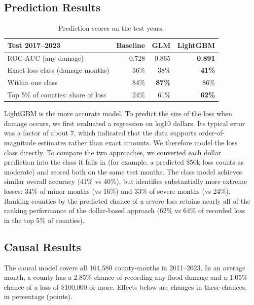 \documentclass[10pt,twocolumn]{article}
\begin{document}
\subsection{Prediction Results}

\begin{table}[H]
\centering
\small
\renewcommand{\arraystretch}{1.15}
\begin{tabularx}{\linewidth}{@{}Lrrr@{}}
\toprule
Test 2017--2023 & Baseline & GLM & LightGBM \\
\midrule
ROC-AUC (any damage)               & 0.728 & 0.865 & \textbf{0.891} \\
Exact loss class (damage months)   & 36\%  & 38\%  & \textbf{41\%} \\
Within one class                   & 84\%  & \textbf{87\%} & 86\% \\
Top 5\% of counties: share of loss & 24\%  & 61\%  & \textbf{62\%} \\
\bottomrule
\end{tabularx}
\caption{Prediction scores on the test years.}
\label{tab:pred-results}
\end{table}

LightGBM is the more accurate model. To predict the size of the
loss when damage occurs, we first evaluated a regression on log10 dollars. Its typical error was a factor of about 7, which indicated that the data supports order-of-magnitude estimates rather than exact amounts. We therefore model the loss class directly. To compare the two approaches,
we converted each dollar prediction into the class it falls in (for example, a predicted \$50k
loss counts as moderate) and scored both on the same test months. The class model achieves similar
overall accuracy (41\% vs 40\%), but identifies substantially more extreme losses: 34\% of minor
months (vs 16\%) and 33\% of severe months (vs 24\%). Ranking counties by the predicted chance of
a severe loss retains nearly all of the ranking performance of the dollar-based approach (62\% vs
64\% of recorded loss in the top 5\% of counties).

\subsection{Causal Results}
\label{sec:adj-results}

The causal model covers all 164{,}580 county-months in 2011--2023. In an average month, a county
has a 2.85\% chance of recording any flood damage and a 1.05\% chance of a loss of \$100{,}000 or
more. Effects below are changes in these chances, in percentage (points).
\end{document}
